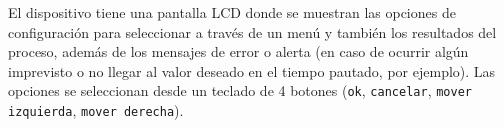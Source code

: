 

El dispositivo tiene una pantalla LCD donde se muestran las opciones de configuración para seleccionar a través de un menú y también los resultados del proceso, además de los mensajes de error o alerta (en caso de ocurrir algún imprevisto o no llegar al valor deseado en el tiempo pautado, por ejemplo). Las opciones se seleccionan desde un teclado de 4 botones (\texttt{ok}, \texttt{cancelar}, \texttt{mover izquierda}, \texttt{mover derecha}).

